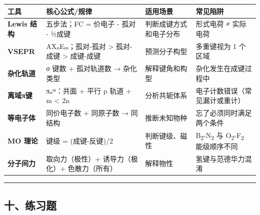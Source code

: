 \documentclass[a4paper,11pt]{ctexart}
\newcounter{none}
\begin{document}
{\def\LTcaptype{none} %
\begin{longtable}[]{@{}
  >{\raggedright\arraybackslash}p{}
  >{\raggedright\arraybackslash}p{}
  >{\raggedright\arraybackslash}p{}
  >{\raggedright\arraybackslash}p{}@{}}
\toprule\noalign{}
\begin{minipage}[b]{\linewidth}\raggedright
工具
\end{minipage} & \begin{minipage}[b]{\linewidth}\raggedright
核心公式/规律
\end{minipage} & \begin{minipage}[b]{\linewidth}\raggedright
适用场景
\end{minipage} & \begin{minipage}[b]{\linewidth}\raggedright
常见陷阱
\end{minipage} \\
\midrule\noalign{}
\endhead
\bottomrule\noalign{}
\endlastfoot
\textbf{Lewis 结构} & 五步法；FC = 价电子 - 孤对 - ½成键 & 判断成键方式和电子分布 & 形式电荷 ≠ 实际电荷 \\
\textbf{VSEPR} & AXₙEₘ；孤对-孤对 \textgreater{} 孤对-成键 \textgreater{} 成键-成键 & 预测分子构型 & 多重键视为 1 个区域 \\
\textbf{杂化轨道} & σ 键数 + 孤对轨道数 → 杂化类型 & 解释键角和构型 & 杂化发生在成键过程中 \\
\textbf{离域π键} & πₙᵐ：共面 + 平行 p 轨道 + m \textless{} 2n & 分析共轭体系 & 电子计数错误（常见漏计或重计） \\
\textbf{等电子体} & 同价电子数 + 同原子数 → 同结构 & 推断未知物种 & 忘了必须同时满足两个条件 \\
\textbf{MO 理论} & 键级 = (成键-反键)/2 & 判断键级、磁性 & B\textsubscript{2}-N\textsubscript{2} 与 O\textsubscript{2}-F\textsubscript{2} 能级顺序不同 \\
\textbf{分子间力} & 取向力（极性）+ 诱导力（极化）+ 色散力（所有） & 解释物性 & 氢键与范德华力混淆 \\
\end{longtable}
}

\begin{center}\rule{0.5\linewidth}{0.5pt}\end{center}

\subsection{十、练习题}\label{ux5341ux7ec3ux4e60ux9898}
\end{document}
